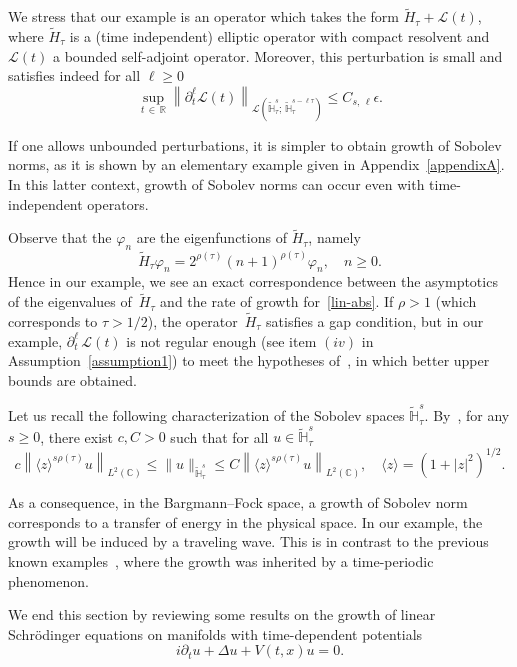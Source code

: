 \documentclass[10pt]{amsart}
\theoremstyle{definition}\newtheorem{defi}[theo]{Definition}\newtheorem{rema}[theo]{Remark}\newtheorem{exam}[theo]{Example}\newtheorem{exem}[theo]{Example}\newtheorem{nota}[theo]{Notation}
\newcommand{\C}{\mathbb{C}}
\newcommand{\R}{\mathbb{R}}
\newcommand{\HH}{\mathbb{H}}
\newcommand{\clL}{\mathcal{L}}
\renewcommand{\L}{\mathscr{L}}
\newcommand*\eps{\epsilon}
\newcommand*\dis{\displaystyle}
\newcommand{\wt}{\widetilde}
\newcommand{\<}{\langle}
\renewcommand{\>}{\rangle}
\renewcommand{\phi}{\varphi}
\begin{document}
We stress that our example is an operator which takes the form $\wt{H}_\tau+\L(t)$, where $\wt{H}_\tau$ is a (time independent) elliptic operator with compact resolvent and $\L(t)$ a bounded self-adjoint operator. Moreover, this perturbation is small and satisfies indeed for all $\ell \geq 0$
\[
\dis \sup_{t\,\in\,\R}\left\| \partial^{\ell}_t\L(t)\right\|_{\clL\left(\widetilde{\HH}_\tau^{s};\,\widetilde{\HH}_\tau^{s- \ell \tau}\right)} \leq C_{s,\,\ell} \eps.
\]



If one allows unbounded perturbations, it is simpler to obtain growth of Sobolev norms, as it is shown by an elementary example given in Appendix~\ref{appendixA}. In this latter context, growth of Sobolev norms can occur even with time-independent operators.


Observe that the $\phi_n$ are the eigenfunctions of $\wt{H}_\tau$, namely
\[
\wt{H}_\tau\phi_n=2^{\rho(\tau)} (n+1)^{\rho(\tau) }\phi_n, \quad n\geq 0.
\]
Hence in our example, we see an exact correspondence between the asymptotics of the eigenvalues of~$\wt{H}_\tau$ and the rate of growth for~\eqref{lin-abs}. If $\rho>1$ (which corresponds to $\tau >1/2$), the operator~$\wt{H}_\tau$ satisfies a gap condition, but in our example, $\partial^{\ell}_t\,\L(t)$ is not regular enough (see item $(iv)$ in Assumption~\ref{assumption1}) to meet the hypotheses of~\cite[Theorems~1.8~and~1.9]{MasRo}, in which better upper bounds are obtained.



Let us recall the following characterization of the Sobolev spaces $\widetilde{\HH}_\tau^{s}$. By~\cite[Lemma~C.1]{GGT}, for any $s \geq 0$, there exist $c,C>0$ such that for all $u\in \wt{\HH}_\tau^s$
\[
c\left\|\<z\>^{s\rho(\tau)} u\right\|_{L^2(\C)} \leq \|u\|_{\wt{\HH}_\tau^s} \leq C\left\|\<z\>^{s\rho(\tau)} u\right\|_{L^2(\C)}, \quad \<z\>=\left(1+|z|^2\right)^{1/2}.
\]

As a consequence, in the Bargmann--Fock space, a growth of Sobolev norm corresponds to a transfer of energy in the physical space. In our example, the growth will be induced by a traveling wave. This is in contrast to the previous known examples~\cite{BGMR2,Delort2,Maspero}, where the growth was inherited by a time-periodic phenomenon.


We end this section by reviewing some results on the growth of linear Schr\"odinger equations on manifolds with time-dependent potentials
\begin{equation}\label{NLS}
i\partial_t u+\Delta u +V(t,x)u=0.
\end{equation}
\end{document}

